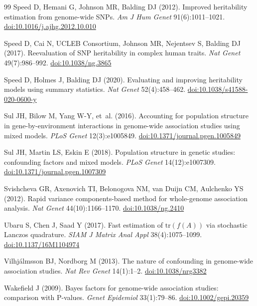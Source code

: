 \documentclass[11pt]{article}
\begin{document}
\begin{thebibliography}{99}
Speed D, Hemani G, Johnson MR, Balding DJ (2012). Improved heritability
estimation from genome-wide SNPs. \emph{Am J Hum Genet} 91(6):1011--1021.
\href{https://doi.org/10.1016/j.ajhg.2012.10.010}{doi:10.1016/j.ajhg.2012.10.010}

Speed D, Cai N, UCLEB Consortium, Johnson MR, Nejentsev S, Balding DJ
(2017). Reevaluation of SNP heritability in complex human traits.
\emph{Nat Genet} 49(7):986--992.
\href{https://doi.org/10.1038/ng.3865}{doi:10.1038/ng.3865}

Speed D, Holmes J, Balding DJ (2020). Evaluating and improving heritability
models using summary statistics. \emph{Nat Genet} 52(4):458--462.
\href{https://doi.org/10.1038/s41588-020-0600-y}{doi:10.1038/s41588-020-0600-y}

Sul JH, Bilow M, Yang W-Y, et~al. (2016). Accounting for population
structure in gene-by-environment interactions in genome-wide association
studies using mixed models. \emph{PLoS Genet} 12(3):e1005849.
\href{https://doi.org/10.1371/journal.pgen.1005849}{doi:10.1371/journal.pgen.1005849}

Sul JH, Martin LS, Eskin E (2018). Population structure in genetic
studies: confounding factors and mixed models. \emph{PLoS Genet}
14(12):e1007309.
\href{https://doi.org/10.1371/journal.pgen.1007309}{doi:10.1371/journal.pgen.1007309}

Svishcheva GR, Axenovich TI, Belonogova NM, van Duijn CM, Aulchenko YS
(2012). Rapid variance components-based method for whole-genome association
analysis. \emph{Nat Genet} 44(10):1166--1170.
\href{https://doi.org/10.1038/ng.2410}{doi:10.1038/ng.2410}

Ubaru S, Chen J, Saad Y (2017). Fast estimation of $\mathrm{tr}(f(A))$ via
stochastic Lanczos quadrature. \emph{SIAM J Matrix Anal Appl}
38(4):1075--1099.
\href{https://doi.org/10.1137/16M1104974}{doi:10.1137/16M1104974}

Vilhj\'almsson BJ, Nordborg M (2013). The nature of confounding in
genome-wide association studies. \emph{Nat Rev Genet} 14(1):1--2.
\href{https://doi.org/10.1038/nrg3382}{doi:10.1038/nrg3382}


Wakefield J (2009). Bayes factors for genome-wide association studies:
comparison with P-values. \emph{Genet Epidemiol} 33(1):79--86.
\href{https://doi.org/10.1002/gepi.20359}{doi:10.1002/gepi.20359}


\end{thebibliography}
\end{document}
